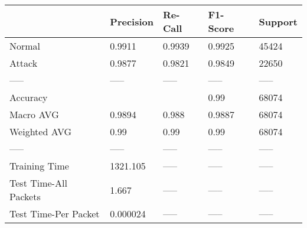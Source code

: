 \begin{tabular}{lllll}
\toprule
{} & Precision & Re-Call & F1-Score & Support \\
\midrule
Normal                &    0.9911 &  0.9939 &   0.9925 &   45424 \\
Attack                &    0.9877 &  0.9821 &   0.9849 &   22650 \\
-----                 &     ----- &   ----- &    ----- &   ----- \\
Accuracy              &           &         &     0.99 &   68074 \\
Macro AVG             &    0.9894 &   0.988 &   0.9887 &   68074 \\
Weighted AVG          &      0.99 &    0.99 &     0.99 &   68074 \\
-----                 &     ----- &   ----- &    ----- &   ----- \\
Training Time         &  1321.105 &   ----- &    ----- &   ----- \\
Test Time-All Packets &     1.667 &   ----- &    ----- &   ----- \\
Test Time-Per Packet  &  0.000024 &   ----- &    ----- &   ----- \\
\bottomrule
\end{tabular}
